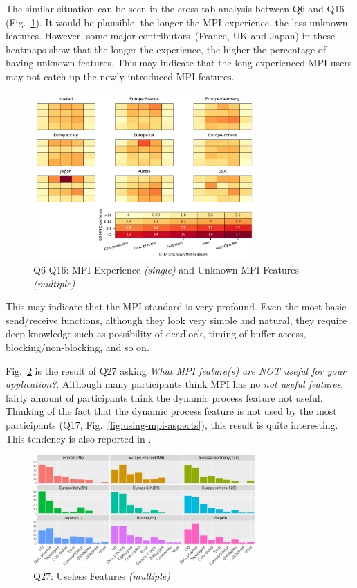 \documentclass[preprint,5p,times]{elsarticle}
\def\myquote#1{{\it #1}}
\def\mcountries{major contributors\xspace{}}%
\begin{document}
The similar situation can be seen in the cross-tab analysis between Q6
and Q16 (Fig.~\ref{fig:experience-and-aspects}). It would be plausible,
the longer the MPI experience, the less unknown features. However,
some \mcountries\  (France, UK and Japan) in these heatmaps show that the
longer the experience, the higher the percentage of having unknown
features. This may indicate that the long experienced MPI users may
not catch up the newly introduced MPI features.

\begin{figure}[htb]
  \begin{center}
    \includegraphics[width=8.5cm]{Figs/Q6-Q16.pdf}
    \caption{Q6-Q16: MPI Experience {\it(single)} and Unknown MPI Features {\it(multiple)}}
    \label{fig:experience-and-aspects}
  \end{center}
\end{figure}

This may indicate
that the MPI standard is very profound. Even the most basic
send/receive functions, although they look very simple and natural,
they require deep knowledge such as possibility of deadlock, timing of
buffer access, blocking/non-blocking, and so on.

Fig.~\ref{fig:useless-features} is the result of Q27 asking \myquote{What MPI
feature(s) are NOT useful for your application?}. Although many
participants think MPI has no {\it not useful features}, fairly amount of
participants think the dynamic process feature not useful. Thinking
of the fact that the dynamic process feature is not used by the most
participants (Q17, Fig.~\ref{fig:using-mpi-aspects}), this result is
quite interesting.
This tendency is also reported in \cite{10.1145/3295500.3356176}.

\begin{figure}[htb]
  \begin{center}
    \includegraphics[width=8.5cm]{R-scripts/Q27.pdf}
    \caption{Q27: Useless Features {\it(multiple)}}
    \label{fig:useless-features}
  \end{center}
\end{figure}
\end{document}
